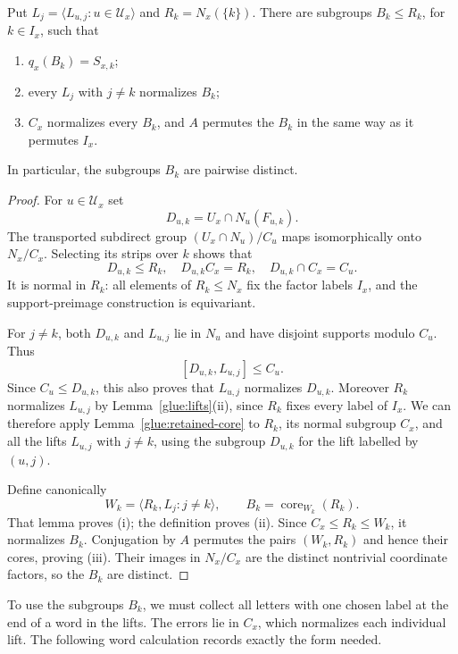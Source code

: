 \begin{lemma}
\label{glue:detectors}
Put $L_j=\langle L_{u,j}:u\in\mathcal U_x\rangle$ and
$R_k=N_x(\{k\})$.  There are subgroups $B_k\le R_k$, for $k\in I_x$,
such that
\begin{enumerate}[label=\textup{(\roman*)}]
\item $q_x(B_k)=S_{x,k}$;
\item every $L_j$ with $j\ne k$ normalizes $B_k$;
\item $C_x$ normalizes every $B_k$, and $A$ permutes the $B_k$ in the
same way as it permutes $I_x$.
\end{enumerate}
In particular, the subgroups $B_k$ are pairwise distinct.
\end{lemma}
\begin{proof}
For $u\in\mathcal U_x$ set
\[
                     D_{u,k}=U_x\cap N_u(F_{u,k}).
\]
The transported subdirect group $(U_x\cap N_u)/C_u$ maps isomorphically
onto $N_x/C_x$.  Selecting its strips over $k$ shows that
\begin{equation}\label{glue:Duk}
 D_{u,k}\le R_k,\quad D_{u,k}C_x=R_k,
 \quad D_{u,k}\cap C_x=C_u.
\end{equation}
It is normal in $R_k$: all elements of $R_k\le N_x$ fix the factor
labels $I_x$, and the support-preimage construction is equivariant.

For $j\ne k$, both $D_{u,k}$ and $L_{u,j}$ lie in $N_u$ and have
disjoint supports modulo $C_u$.  Thus
\[
                    [D_{u,k},L_{u,j}]\le C_u.
\]
Since $C_u\le D_{u,k}$, this also proves that $L_{u,j}$ normalizes
$D_{u,k}$.  Moreover $R_k$ normalizes $L_{u,j}$ by
Lemma~\ref{glue:lifts}(ii), since $R_k$ fixes every label of $I_x$.
We can therefore apply Lemma~\ref{glue:retained-core} to $R_k$, its
normal subgroup $C_x$, and all the lifts $L_{u,j}$ with $j\ne k$, using
the subgroup $D_{u,k}$ for the lift labelled by $(u,j)$.

Define canonically
\[
 W_k=\langle R_k,L_j:j\ne k\rangle,
 \qquad B_k=\operatorname{core}_{W_k}(R_k).
\]
That lemma proves (i); the definition proves (ii).
Since $C_x\le R_k\le W_k$, it normalizes $B_k$.
Conjugation by $A$ permutes the pairs $(W_k,R_k)$ and hence their
cores, proving (iii).  Their images in $N_x/C_x$ are the distinct
nontrivial coordinate factors, so the $B_k$ are distinct.
\end{proof}

To use the subgroups $B_k$, we must collect all letters with one
chosen label at the end of a word in the lifts.  The errors lie in
$C_x$, which normalizes each individual lift.  The following word
calculation records exactly the form needed.

